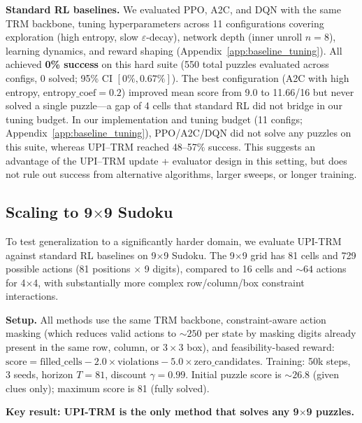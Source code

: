 \documentclass{article}
\theoremstyle{plain}
\theoremstyle{definition}
\theoremstyle{remark}
\begin{document}
{\textbf{Standard RL baselines.}
We evaluated PPO, A2C, and DQN with the same TRM backbone, tuning hyperparameters across 11 configurations covering exploration (high entropy, slow $\varepsilon$-decay), network depth (inner unroll $n{=}8$), learning dynamics, and reward shaping (Appendix~\ref{app:baseline_tuning}).
All achieved \textbf{0\% success} on this hard suite (550 total puzzles evaluated across configs, 0 solved; 95\% CI $[0\%, 0.67\%]$).
The best configuration (A2C with high entropy, $\mathrm{entropy\_coef}{=}0.2$) improved mean score from 9.0 to 11.66/16 but never solved a single puzzle---a gap of 4 cells that standard RL did not bridge in our tuning budget.
In our implementation and tuning budget (11 configs; Appendix~\ref{app:baseline_tuning}), PPO/A2C/DQN did not solve any puzzles on this suite, whereas UPI--TRM reached 48--57\% success. This suggests an advantage of the UPI--TRM update + evaluator design in this setting, but does not rule out success from alternative algorithms, larger sweeps, or longer training.

\subsection{Scaling to 9$\times$9 Sudoku}
\label{sec:9x9_experiments}

To test generalization to a significantly harder domain, we evaluate UPI-TRM against standard RL baselines on 9$\times$9 Sudoku. The 9$\times$9 grid has 81 cells and 729 possible actions (81 positions $\times$ 9 digits), compared to 16 cells and ${\sim}64$ actions for 4$\times$4, with substantially more complex row/column/box constraint interactions.

\textbf{Setup.}
All methods use the same TRM backbone, constraint-aware action masking (which reduces valid actions to ${\sim}250$ per state by masking digits already present in the same row, column, or $3{\times}3$ box), and feasibility-based reward: $\mathrm{score} = \mathrm{filled\_cells} - 2.0 \times \mathrm{violations} - 5.0 \times \mathrm{zero\_candidates}$.
Training: 50k steps, 3 seeds, horizon $T{=}81$, discount $\gamma{=}0.99$.
Initial puzzle score is ${\sim}26.8$ (given clues only); maximum score is 81 (fully solved).

\textbf{Key result: UPI-TRM is the only method that solves any 9$\times$9 puzzles.}

}
\end{document}
